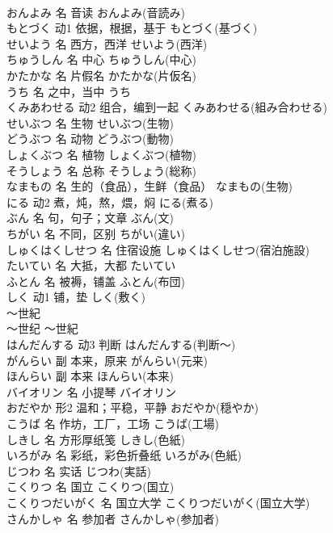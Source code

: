 \documentclass[8pt]{extreport}
\begin{document}
\begin{CJK}{UTF8}{min}
\\	おんよみ	名	音读	おんよみ(音読み)	
\\	もとづく	动1	依据，根据，基于	もとづく(基づく)	
\\	せいよう	名	西方，西洋	せいよう(西洋)	
\\	ちゅうしん	名	中心	ちゅうしん(中心)	
\\	かたかな	名	片假名	かたかな(片仮名)	
\\	うち	名	之中，当中	うち	
\\	くみあわせる	动2	组合，编到一起	くみあわせる(組み合わせる)	
\\	せいぶつ	名	生物	せいぶつ(生物)	
\\	どうぶつ	名	动物	どうぶつ(動物)	
\\	しょくぶつ	名	植物	しょくぶつ(植物)	
\\	そうしょう	名	总称	そうしょう(総称)	
\\	なまもの	名	生的（食品），生鲜（食品）	なまもの(生物)	
\\	にる	动2	煮，炖，熬，煨，焖	にる(煮る)	
\\	ぶん	名	句，句子；文章	ぶん(文)	
\\	ちがい	名	不同，区别	ちがい(違い)	
\\	しゅくはくしせつ	名	住宿设施	しゅくはくしせつ(宿泊施設)	
\\	たいてい	名	大抵，大都	たいてい	
\\	ふとん	名	被褥，铺盖	ふとん(布団)	
\\	しく	动1	铺，垫	しく(敷く)	
\\	～世紀	
\\	～世纪	～世紀	
\\	はんだんする	动3	判断	はんだんする(判断～)	
\\	がんらい	副	本来，原来	がんらい(元来)	
\\	ほんらい	副	本来	ほんらい(本来)	
\\	バイオリン	名	小提琴	バイオリン	
\\	おだやか	形2	温和；平稳，平静	おだやか(穏やか)	
\\	こうば	名	作坊，工厂，工场	こうば(工場)	
\\	しきし	名	方形厚纸笺	しきし(色紙)	
\\	いろがみ	名	彩纸，彩色折叠纸	いろがみ(色紙)	
\\	じつわ	名	实话	じつわ(実話)	
\\	こくりつ	名	国立	こくりつ(国立)	
\\	こくりつだいがく	名	国立大学	こくりつだいがく(国立大学)	
\\	さんかしゃ	名	参加者	さんかしゃ(参加者)	

\end{CJK}
\end{document}
